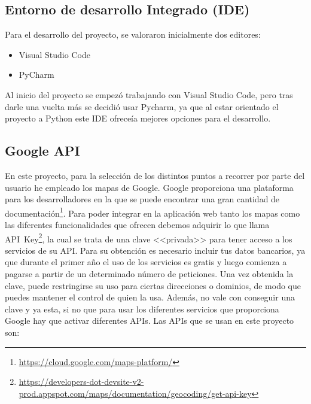 \subsection{Entorno de desarrollo Integrado (IDE)}
Para el desarrollo del proyecto, se valoraron inicialmente dos editores:
\begin{itemize}
	\item Visual Studio Code
	\item PyCharm
\end{itemize}
Al inicio del proyecto se empezó trabajando con Visual Studio Code, pero tras darle una vuelta más se decidió usar Pycharm, ya que al estar orientado el proyecto a Python este IDE ofreceía mejores opciones para el desarrollo.


\subsection{Google API}
En este proyecto, para la selección de los distintos puntos a recorrer por parte del usuario he empleado los mapas de Google. Google proporciona una plataforma para los desarrolladores en la que se puede encontrar una gran cantidad de documentación\footnote{\url{https://cloud.google.com/maps-platform/}}.
Para poder integrar en la aplicación web tanto los mapas como las diferentes funcionalidades que ofrecen debemos adquirir lo que llama API~Key\footnote{\url{https://developers-dot-devsite-v2-prod.appspot.com/maps/documentation/geocoding/get-api-key}}, la cual se trata de una clave <<privada>> para tener acceso a los servicios de su API. Para su obtención es necesario incluir tus datos bancarios, ya que durante el primer año el uso de los servicios es gratis y luego comienza a pagarse a partir de un determinado número de peticiones.
Una vez obtenida la clave, puede restringirse su uso para ciertas direcciones o dominios, de modo que puedes mantener el control de quien la usa. Además, no vale con conseguir una clave y ya esta, si no que para usar los diferentes servicios que proporciona Google hay que activar diferentes APIs.
Las APIs que se usan en este proyecto son:
